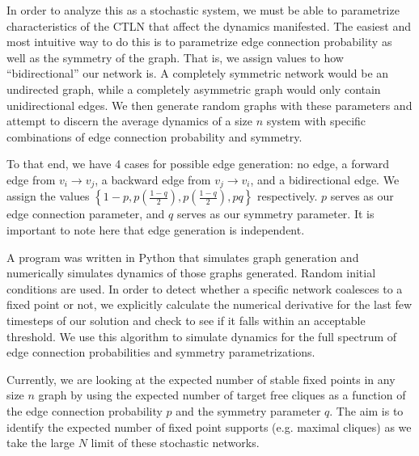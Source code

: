 In order to analyze this as a stochastic system, we must be able to parametrize characteristics of the CTLN that affect the dynamics manifested. The easiest and most intuitive way to do this is to parametrize edge connection probability as well as the symmetry of the graph. That is, we assign values to how ``bidirectional'' our network is. A completely symmetric network would be an undirected graph, while a completely asymmetric graph would only contain unidirectional edges. We then generate random graphs with these parameters and attempt to discern the average dynamics of a size $n$ system with specific combinations of edge connection probability and symmetry.

To that end, we have 4 cases for possible edge generation: no edge, a forward edge from $v_i\to v_j$, a backward edge from $v_j\to v_i$, and a bidirectional edge. We assign the values $\left\{1-p, p \left( \frac{1-q}{2}  \right), p \left( \frac{1-q}{2}  \right), pq \right\}$ respectively. $p$ serves as our edge connection parameter, and $q$ serves as our symmetry parameter. It is important to note here that edge generation is independent.

A program was written in Python that simulates graph generation and numerically simulates dynamics of those graphs generated. Random initial conditions are used. In order to detect whether a specific network coalesces to a fixed point or not, we explicitly calculate the numerical derivative for the last few timesteps of our solution and check to see if it falls within an acceptable threshold. We use this algorithm to simulate dynamics for the full spectrum of edge connection probabilities and symmetry parametrizations. 

Currently, we are looking at the expected number of stable fixed points in any size $n$ graph by using the expected number of target free cliques as a function of the edge connection probability $p$ and the symmetry parameter $q$. The aim is to identify the expected number of fixed point supports (e.g. maximal cliques) as we take the large $N$ limit of these stochastic networks.